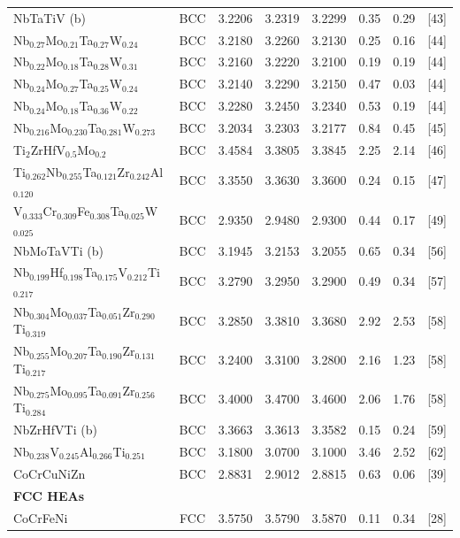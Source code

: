 \documentclass[a4paper,10pt,5p]{elsarticle}
\begin{document}
\begin{table}[htbp]
\begin{tabular}{lccccccc}
    NbTaTiV (b) & BCC & 3.2206 & 3.2319 & 3.2299 & 0.35 & 0.29 & [43] \\
    Nb$_{0.27}$Mo$_{0.21}$Ta$_{0.27}$W$_{0.24}$ & BCC & 3.2180 & 3.2260 & 3.2130 & 0.25 & 0.16 & [44] \\
    Nb$_{0.22}$Mo$_{0.18}$Ta$_{0.28}$W$_{0.31}$ & BCC & 3.2160 & 3.2220 & 3.2100 & 0.19 & 0.19 & [44] \\
    Nb$_{0.24}$Mo$_{0.27}$Ta$_{0.25}$W$_{0.24}$ & BCC & 3.2140 & 3.2290 & 3.2150 & 0.47 & 0.03 & [44] \\
    Nb$_{0.24}$Mo$_{0.18}$Ta$_{0.36}$W$_{0.22}$ & BCC & 3.2280 & 3.2450 & 3.2340 & 0.53 & 0.19 & [44] \\
    Nb$_{0.216}$Mo$_{0.230}$Ta$_{0.281}$W$_{0.273}$ & BCC & 3.2034 & 3.2303 & 3.2177 & 0.84 & 0.45 & [45] \\
    Ti$_2$ZrHfV$_{0.5}$Mo$_{0.2}$ & BCC & 3.4584 & 3.3805 & 3.3845 & 2.25 & 2.14 & [46] \\
    Ti$_{0.262}$Nb$_{0.255}$Ta$_{0.121}$Zr$_{0.242}$Al$_{0.120}$ & BCC & 3.3550 & 3.3630 & 3.3600 & 0.24 & 0.15 & [47] \\
    V$_{0.333}$Cr$_{0.309}$Fe$_{0.308}$Ta$_{0.025}$W$_{0.025}$ & BCC & 2.9350 & 2.9480 & 2.9300 & 0.44 & 0.17 & [49] \\
    NbMoTaVTi (b) & BCC & 3.1945 & 3.2153 & 3.2055 & 0.65 & 0.34 & [56] \\
    Nb$_{0.199}$Hf$_{0.198}$Ta$_{0.175}$V$_{0.212}$Ti$_{0.217}$ & BCC & 3.2790 & 3.2950 & 3.2900 & 0.49 & 0.34 & [57] \\
    Nb$_{0.304}$Mo$_{0.037}$Ta$_{0.051}$Zr$_{0.290}$Ti$_{0.319}$ & BCC & 3.2850 & 3.3810 & 3.3680 & 2.92 & 2.53 & [58] \\
    Nb$_{0.255}$Mo$_{0.207}$Ta$_{0.190}$Zr$_{0.131}$Ti$_{0.217}$ & BCC & 3.2400 & 3.3100 & 3.2800 & 2.16 & 1.23 & [58] \\
    Nb$_{0.275}$Mo$_{0.095}$Ta$_{0.091}$Zr$_{0.256}$Ti$_{0.284}$ & BCC & 3.4000 & 3.4700 & 3.4600 & 2.06 & 1.76 & [58] \\
    NbZrHfVTi (b) & BCC & 3.3663 & 3.3613 & 3.3582 & 0.15 & 0.24 & [59] \\
    Nb$_{0.238}$V$_{0.245}$Al$_{0.266}$Ti$_{0.251}$ & BCC & 3.1800 & 3.0700 & 3.1000 & 3.46 & 2.52 & [62] \\
    CoCrCuNiZn & BCC & 2.8831 & 2.9012 & 2.8815 & 0.63 & 0.06 & [39] \\
\hline
\multicolumn{8}{l}{\textbf{FCC HEAs}} \\
\hline
    CoCrFeNi & FCC & 3.5750 & 3.5790 & 3.5870 & 0.11 & 0.34 & [28] \\

\end{tabular}
\end{table}
\end{document}
